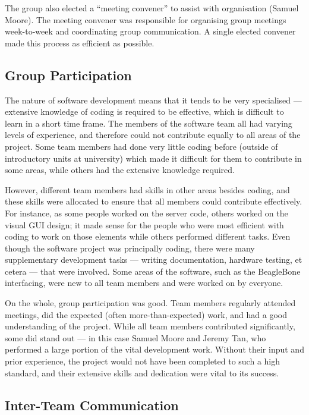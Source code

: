 The group also elected a ``meeting convener'' to assist with organisation (Samuel Moore). The meeting convener was responsible for organising group meetings week-to-week and coordinating group communication. A single elected convener made this process as efficient as possible.

\subsection{Group Participation}

The nature of software development means that it tends to be very specialised --- extensive knowledge of coding is required to be effective, which is difficult to learn in a short time frame. The members of the software team all had varying levels of experience, and therefore could not contribute equally to all areas of the project. Some team members had done very little coding before (outside of introductory units at university) which made it difficult for them to contribute in some areas, while others had the extensive knowledge required.


However, different team members had skills in other areas besides coding, and these skills were allocated to ensure that all members could contribute effectively. For instance, as some people worked on the server code, others worked on the visual GUI design; it made sense for the people who were most efficient with coding to work on those elements while others performed different tasks. Even though the software project was principally coding, there were many supplementary development tasks --- writing documentation, hardware testing, et cetera --- that were involved. Some areas of the software, such as the BeagleBone interfacing, were new to all team members and were worked on by everyone.


On the whole, group participation was good. Team members regularly attended meetings, did the expected (often more-than-expected) work, and had a good understanding of the project. While all team members contributed significantly, some did stand out --- in this case Samuel Moore and Jeremy Tan, who performed a large portion of the vital development work. Without their input and prior experience, the project would not have been completed to such a high standard, and their extensive skills and dedication were vital to its success.

\subsection{Inter-Team Communication}

